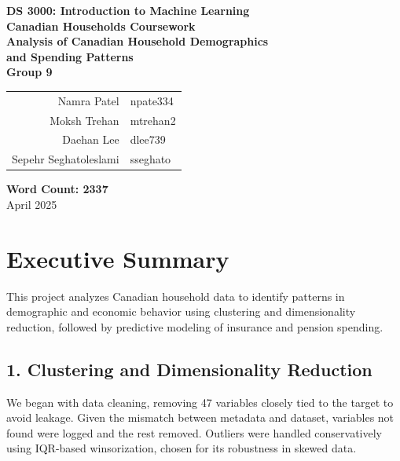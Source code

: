 \documentclass{article}
\begin{document}
\begin{titlepage}
    \centering
    \vspace*{2.5cm}
    
    {\LARGE \textbf{DS 3000: Introduction to Machine Learning}}\\[0.5cm]
    {\Large \textbf{Canadian Households Coursework}}\\[1.5cm]
    
    {\Huge \textbf{Analysis of Canadian Household Demographics \\[0.3cm] and Spending Patterns}}\\[2cm]

    {\large \textbf{Group 9}}\\[0.8cm]
    \begin{tabular}{rl}
        Namra Patel & \hspace{1cm} npate334 \\
        Moksh Trehan & \hspace{1cm} mtrehan2 \\
        Daehan Lee & \hspace{1cm} dlee739 \\
        Sepehr Seghatoleslami & \hspace{1cm} sseghato \\
    \end{tabular}
    
    \vfill
    {\large \textbf{Word Count: 2337}}\\[1.5cm]    
    {\large April 2025}
\end{titlepage}


\tableofcontents
\newpage	

\section{Executive Summary}

This project analyzes Canadian household data to identify patterns in demographic and economic behavior using clustering and dimensionality reduction, followed by predictive modeling of insurance and pension spending.

\subsection*{1. Clustering and Dimensionality Reduction}

We began with data cleaning, removing 47 variables closely tied to the target to avoid leakage. Given the mismatch between metadata and dataset, variables not found were logged and the rest removed. Outliers were handled conservatively using IQR-based winsorization, chosen for its robustness in skewed data.
\end{document}
